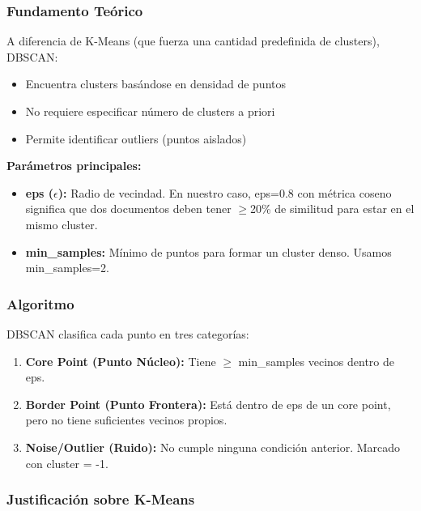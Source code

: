 \subsubsection{Fundamento Teórico}
\label{subsubsec:fundamento_dbscan}

A diferencia de K-Means (que fuerza una cantidad predefinida de clusters), DBSCAN:
\begin{itemize}
    \item Encuentra clusters basándose en densidad de puntos
    \item No requiere especificar número de clusters a priori
    \item Permite identificar outliers (puntos aislados)
\end{itemize}

\textbf{Parámetros principales:}
\begin{itemize}
    \item \textbf{eps ($\epsilon$):} Radio de vecindad. En nuestro caso, eps=0.8 con métrica coseno significa que dos documentos deben tener $\geq$20\% de similitud para estar en el mismo cluster.
    \item \textbf{min\_samples:} Mínimo de puntos para formar un cluster denso. Usamos min\_samples=2.
\end{itemize}

\subsubsection{Algoritmo}
\label{subsubsec:algoritmo_dbscan}

DBSCAN clasifica cada punto en tres categorías:

\begin{enumerate}
    \item \textbf{Core Point (Punto Núcleo):} Tiene $\geq$ min\_samples vecinos dentro de eps.
    \item \textbf{Border Point (Punto Frontera):} Está dentro de eps de un core point, pero no tiene suficientes vecinos propios.
    \item \textbf{Noise/Outlier (Ruido):} No cumple ninguna condición anterior. Marcado con cluster = -1.
\end{enumerate}

\subsubsection{Justificación sobre K-Means}
\label{subsubsec:mt_justificacion_dbscan}

